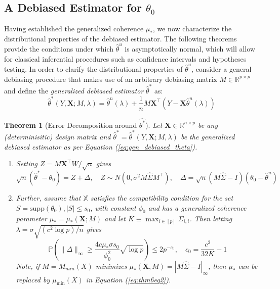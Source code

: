 \documentclass{article}
\newtheorem{theorem}{Theorem}
\begin{document}
\subsection{A Debiased Estimator for $\theta_0$}
\label{sec:2.2}
Having established the generalized coherence $\mu_*$, we now characterize the  distributional properties of the debiased estimator. The following theorems  provide the conditions under which $\hat{\theta}^u$ is asymptotically normal, which will allow for classical inferential procedures such as confidence intervals and hypotheses testing. In order to clarify the distributional properties of $\hat{\theta}^u$, \citet{javanmard14a} consider a general debiasing procedure that makes use of an arbitrary debiasing matrix $M \in \mathbb{R}^{p\times p}$ and define the \textit{generalized debiased estimator} $\hat{\theta}^*$ as: 
\begin{equation}
    \hat{\theta}^*(Y, \mathbf{X}; M, \lambda) = \hat{\theta}^n(\lambda) + \frac{1}{n}M\mathbf{X}^\top (Y-\mathbf{X}\hat{\theta}^n(\lambda))
    \label{eq:gen_debiased_theta}
\end{equation}
\begin{theorem}[Error Decomposition around $\hat{\theta^*}$]
\label{thm:thm6}
Let $\mathbf{X} \in \mathbb{R}^{n\times p}$ be any (determinisitic) design matrix and $\hat{\theta}^* = \hat{\theta}^*(Y, \mathbf{X}; M,\lambda)$ be the generalized debiased estimator as per Equation (\ref{eq:gen_debiased_theta}). 
\begin{enumerate}
    \item Setting  $Z= M \mathbf{X}^\top W/\sqrt{n}$ gives
    \begin{equation}
        \sqrt{n}(\hat{\theta}^*- \theta_0) = Z + \Delta, \quad Z \sim N(0, \sigma^2 M \hat{\Sigma}M^\top), \quad \Delta = \sqrt{n}(M\hat{\Sigma} - I)(\theta_0 - \hat{\theta}^n)
    \end{equation}
    \item Further, assume that $\mathbb{X}$ satisfies the compatibility condition for the set $S = \text{supp}(\theta_0), |S| \le s_0$, with constant $\phi_0$ and has a generalized coherence parameter $\mu_* = \mu_*(\mathbf{X}; M)$ and let $K \equiv \max_{i \in [p]}\hat{\Sigma}_{i,i}$. Then letting $\lambda = \sigma \sqrt{(c^2 \log p)/n}$ gives
    \begin{equation}
    \label{eq:thm6eq2}
        \mathbb{P}\left(\|\Delta\|_\infty \ge \frac{4c \mu_* \sigma s_0}{\phi_0^2} \sqrt{\log p}\right) \le 2p^{-c_0}, \quad c_0 = \frac{c^2}{32K}-1
    \end{equation}
    Note, if $M= M_{min}(X)$ minimizes $\mu_*(\mathbf{X},M) = |M\hat{\Sigma} - I|_\infty$, then $\mu_*$ can be replaced by $\mu_\text{min}(X)$ in Equation (\ref{eq:thm6eq2}).
\end{enumerate}
\end{theorem}
\end{document}

